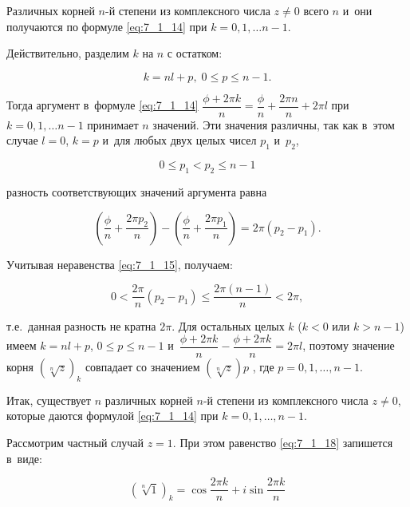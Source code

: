 Различных корней $n$-й степени из комплексного числа $z \ne 0$ всего $n$ и~они получаются
по формуле \eqref{eq:7_1_14} при $k = 0, 1, \dots n-1$.

Действительно, разделим $k$ на $n$ с остатком:

\begin{equation*}
k = nl + p, \; 0 \leqslant p \leqslant n - 1.
\end{equation*}

Тогда аргумент в~формуле \eqref{eq:7_1_14}
$\dfrac{\phi + 2\pi k}{n} = \dfrac{\phi}{n} + \dfrac{2\pi n}{n} + 2\pi l$
при $k = 0, 1, \dots n-1$ принимает $n$ значений. Эти значения различны,
так как в~этом случае $l = 0$, $k = p$ и~для любых двух целых чисел $p_{1}$ и~$p_{2}$,

\begin{equation}\label{eq:7_1_15}
0 \leqslant p_{1} < p_{2} \leqslant n - 1
\end{equation}

\noindent
разность соответствующих значений аргумента равна

\begin{equation*}
\left( \dfrac{\phi}{n} + \dfrac{2\pi p_{2}}{n} \right) -
\left( \dfrac{\phi}{n} + \dfrac{2\pi p_{1}}{n} \right) =
2\pi (p_{2} - p_{1}).
\end{equation*}

\noindent
Учитывая неравенства \eqref{eq:7_1_15}, получаем:

\begin{equation*}
0 < \dfrac{2\pi}{n} (p_{2} - p_{1}) \leqslant \dfrac{2\pi (n-1)}{n} < 2\pi,
\end{equation*}

\noindent
т.е.\ данная разность не кратна $2\pi$. Для остальных целых $k$ ($k < 0$ или $k > n - 1$)
имеем $k = nl + p$, $0 \leqslant p \leqslant n - 1$
и~$\dfrac{\phi + 2\pi k}{n} - \dfrac{\phi + 2\pi k}{n} = 2\pi l$, поэтому значение корня
$\left( \sqrt[\scriptstyle n]{z} \right)_{k}$ совпадает со значением
$\left( \sqrt[\scriptstyle n]{z} \right)p$ , где $p = 0, 1, \dots, n - 1$.

Итак, существует $n$ различных корней $n$-й степени из комплексного числа $z \ne 0$,
которые даются формулой \eqref{eq:7_1_14} при $k = 0, 1, \dots, n - 1$.

Рассмотрим частный случай $z = 1$. При этом равенство \eqref{eq:7_1_18}
запишется в~виде:

\begin{equation}\label{eq:7_1_16}
\left( \sqrt[\scriptstyle n]{1} \right)_{k} = 
\cos \dfrac{2\pi k}{n} + i \sin \dfrac{2\pi k}{n}
\end{equation}

